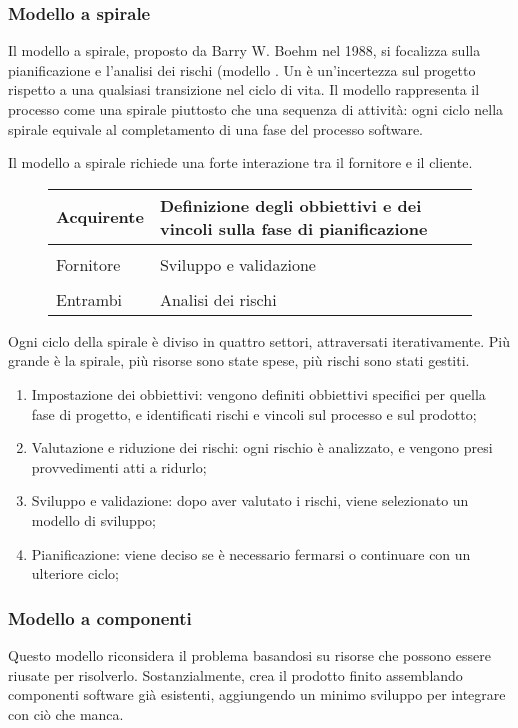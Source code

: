 \subsubsection{Modello a spirale}
Il modello a spirale, proposto da Barry W. Boehm nel 1988, si focalizza sulla pianificazione e l'analisi dei rischi (modello . Un  è un'incertezza sul progetto rispetto a una qualsiasi transizione nel ciclo di vita. Il modello rappresenta il processo come una spirale piuttosto che una sequenza di attività: ogni ciclo nella spirale equivale al completamento di una fase del processo software.

Il modello a spirale richiede una forte interazione tra il fornitore e il cliente.
\begin{figure}[h!]
	\centering
	\begin{tabular}{|l|l|}
		\hline	
		Acquirente & Definizione degli obbiettivi e dei vincoli sulla fase di pianificazione \\
		\hline \\
		Fornitore & Sviluppo e validazione \\
		\hline \\
		Entrambi & Analisi dei rischi \\
		\hline
	\end{tabular}
\end{figure}

Ogni ciclo della spirale è diviso in quattro settori, attraversati iterativamente. Più grande è la spirale, più risorse sono state spese, più rischi sono stati gestiti.
\begin{enumerate}
	\item Impostazione dei obbiettivi: vengono definiti obbiettivi specifici per quella fase di progetto, e identificati rischi e vincoli sul processo e sul prodotto;
	\item Valutazione e riduzione dei rischi: ogni rischio è analizzato, e vengono presi provvedimenti atti a ridurlo;
	\item Sviluppo e validazione: dopo aver valutato i rischi, viene selezionato un modello di sviluppo;
	\item Pianificazione: viene deciso se è necessario fermarsi o continuare con un ulteriore ciclo;
\end{enumerate}

\subsubsection{Modello a componenti}
Questo modello riconsidera il problema basandosi su risorse che possono essere riusate per risolverlo. Sostanzialmente, crea il prodotto finito assemblando componenti software già esistenti, aggiungendo un minimo sviluppo per integrare con ciò che manca.


